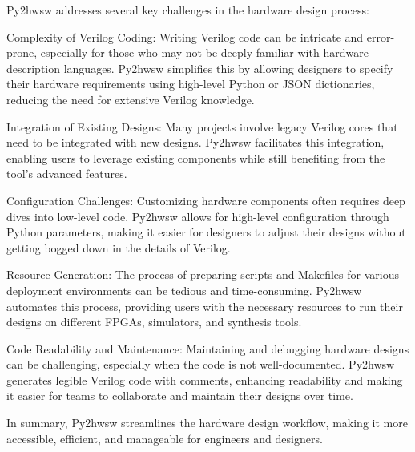 %

Py2hwsw addresses several key challenges in the hardware design process:

Complexity of Verilog Coding: Writing Verilog code can be intricate and error-prone, especially for those who may not be deeply familiar with hardware description languages. Py2hwsw simplifies this by allowing designers to specify their hardware requirements using high-level Python or JSON dictionaries, reducing the need for extensive Verilog knowledge.

Integration of Existing Designs: Many projects involve legacy Verilog cores that need to be integrated with new designs. Py2hwsw facilitates this integration, enabling users to leverage existing components while still benefiting from the tool's advanced features.

Configuration Challenges: Customizing hardware components often requires deep dives into low-level code. Py2hwsw allows for high-level configuration through Python parameters, making it easier for designers to adjust their designs without getting bogged down in the details of Verilog.

Resource Generation: The process of preparing scripts and Makefiles for various deployment environments can be tedious and time-consuming. Py2hwsw automates this process, providing users with the necessary resources to run their designs on different FPGAs, simulators, and synthesis tools.

Code Readability and Maintenance: Maintaining and debugging hardware designs can be challenging, especially when the code is not well-documented. Py2hwsw generates legible Verilog code with comments, enhancing readability and making it easier for teams to collaborate and maintain their designs over time.

In summary, Py2hwsw streamlines the hardware design workflow, making it more accessible, efficient, and manageable for engineers and designers.
